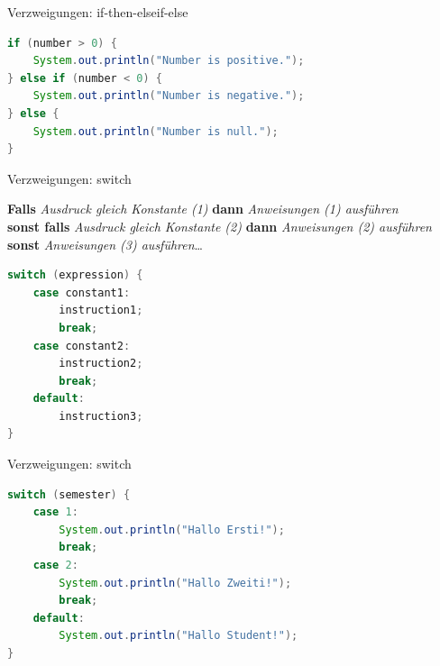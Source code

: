 \documentclass[18pt]{beamer}
\begin{document}
\begin{frame}[fragile]{Verzweigungen: if-then-elseif-else}
    \begin{exampleblock}{}
        \begin{lstlisting}[language=Java]
if (number > 0) {
    System.out.println("Number is positive.");
} else if (number < 0) {
    System.out.println("Number is negative.");
} else {
    System.out.println("Number is null.");
}
        \end{lstlisting}
    \end{exampleblock}
\end{frame}

\begin{frame}[fragile]{Verzweigungen: switch}
    \begin{block}{}
        \textbf{Falls} \textit{Ausdruck gleich Konstante (1)} \textbf{dann} \textit{Anweisungen (1) ausführen}\\
        \textbf{sonst falls} \textit{Ausdruck gleich Konstante (2)} \textbf{dann} \textit{Anweisungen (2) ausführen}\\
        \textbf{sonst} \textit{Anweisungen (3) ausführen}\dots
    \end{block}
    \pause

    \begin{block}{}
        \begin{lstlisting}[language=Java,basicstyle=\scriptsize]
switch (expression) {
    case constant1:
        instruction1;
        break;
    case constant2:
        instruction2;
        break;
    default:
        instruction3;
}
        \end{lstlisting}
    \end{block}
\end{frame}

\begin{frame}[fragile]{Verzweigungen: switch}
    \begin{exampleblock}{}
        \begin{lstlisting}[language=Java]
switch (semester) {
    case 1:
        System.out.println("Hallo Ersti!");
        break;
    case 2:
        System.out.println("Hallo Zweiti!");
        break;
    default:
        System.out.println("Hallo Student!");
}
        \end{lstlisting}
    \end{exampleblock}
\end{frame}
\end{document}
